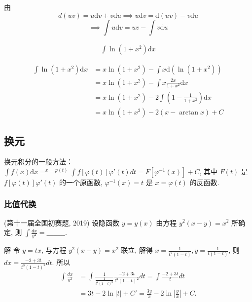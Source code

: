 \documentclass[lang=cn,newtx,10pt,scheme=chinese]{elegantbook}
\begin{document}
    由
    \begin{equation}
      d(uv)=u\mathrm{d}v+v\mathrm{d}u\implies u\mathrm{d}v= \mathrm{d}(uv)-v \mathrm{d}u
    \end{equation}
    \begin{equation}
      \implies \int u \mathrm{d} v=uv - \int v \mathrm{d}u
    \end{equation}
    \begin{example}
      \begin{equation}
        \begin{aligned}
        \int \ln (1+x^{2}) \mathrm{d}x
        \end{aligned}
      \end{equation}
    \end{example}
    \begin{solution}
      \begin{equation}
        \begin{aligned}
        \int \ln (1+x^{2}) \mathrm{d}x&= x \ln(1+x^{2})-\int x \mathrm{d}(\ln (1+x^{2})) \\
&=x \ln(1+x^{2}) - \int x \frac{2x}{1+x^{2}} \mathrm{d}x\\
&=x \ln(1+x^{2}) - 2 \int (1- \frac{1}{1+x^{2}})\mathrm{d}x\\
&=x \ln(1+x^{2})- 2(x-\arctan x)+C
        \end{aligned}
      \end{equation}
    \end{solution}

    \subsection{换元}
    换元积分的一般方法： $\int f(x) \mathrm{d}x  =^{x=\varphi(t)} \int f[\varphi(t)] \varphi'(t) dt = F[\varphi^{-1}(x)] + C$, 其中 $F(t)$ 是 $f[\varphi(t)] \varphi'(t)$ 的一个原函数, $\varphi^{-1}(x) = t$ 是 $x = \varphi(t)$ 的反函数.
    \subsubsection{比值代换}
\begin{example}
  (第十一届全国初赛题, 2019) 设隐函数 $y = y(x)$ 由方程 $y^2(x - y) = x^2$ 所确定, 则 $\int \frac{dx}{y^2} = \_\_\_\_\_\_\_\_$.
\end{example}
\begin{solution}
  解 令 $y = tx$, 与方程 $y^2(x - y) = x^2$ 联立, 解得 $x = \frac{1}{t^2(1 - t)}, y = \frac{1}{t(1 - t)}$, 则 $dx = \frac{-2 + 3t}{t^3(1 - t)^2} dt$. 所以
  $$
  \begin{aligned}
  \int \frac{dx}{y^2} &= \int \frac{1}{\frac{1}{t^2(1 - t)^2}} \frac{-2 + 3t}{t^3(1 - t)^2} dt = \int \frac{-2 + 3t}{t} dt \\
  &= 3t - 2 \ln|t| + C' = \frac{3y}{x} - 2 \ln\left|\frac{y}{x}\right| + C.
  \end{aligned}
  $$
\end{solution}
\end{document}
